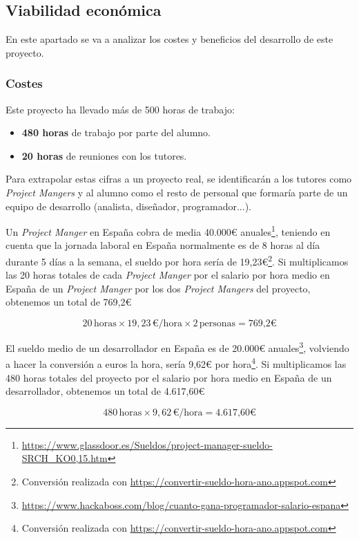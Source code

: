 \subsection{Viabilidad económica}

En este apartado se va a analizar los costes y beneficios del desarrollo de este proyecto.

\subsubsection{Costes}
 
Este proyecto ha llevado más de 500 horas de trabajo:\begin{itemize}
    \item \textbf{480 horas} de trabajo por parte del alumno.
    \item \textbf{20 horas} de reuniones con los tutores.
\end{itemize}  

Para extrapolar estas cifras a un proyecto real, se identificarán a los tutores como \textit{Project Mangers} y al alumno como el resto de personal que formaría parte de un equipo de desarrollo (analista, diseñador, programador...).

Un \textit{Project Manger} en España cobra de media 40.000€ anuales\footnote{\url{https://www.glassdoor.es/Sueldos/project-manager-sueldo-SRCH_KO0,15.htm}}, teniendo en cuenta que la jornada laboral en España normalmente es de 8 horas al día durante 5 días a la semana, el sueldo por hora sería de 19,23€\footnote{Conversión realizada con \url{https://convertir-sueldo-hora-ano.appspot.com}}.
Si multiplicamos las 20 horas totales de cada \textit{Project Manger} por el salario por hora medio en España de un \textit{Project Manger} por los dos \textit{Project Mangers} del proyecto, obtenemos un total de 769,2€

$$20 \, \text{horas} \times 19,23 \, \text{€/hora} \times 2 \, \text{personas} = \text{769,2€}$$

El sueldo medio de un desarrollador en España es de 20.000€ anuales\footnote{\url{https://www.hackaboss.com/blog/cuanto-gana-programador-salario-espana}}, volviendo a hacer la conversión a euros la hora, sería 9,62€ por hora\footnote{Conversión realizada con \url{https://convertir-sueldo-hora-ano.appspot.com}}.
Si multiplicamos las 480 horas totales del proyecto por el salario por hora medio en España de un desarrollador, obtenemos un total de 4.617,60€

$$480 \, \text{horas} \times 9,62 \, \text{€/hora} = \text{4.617,60€}$$

